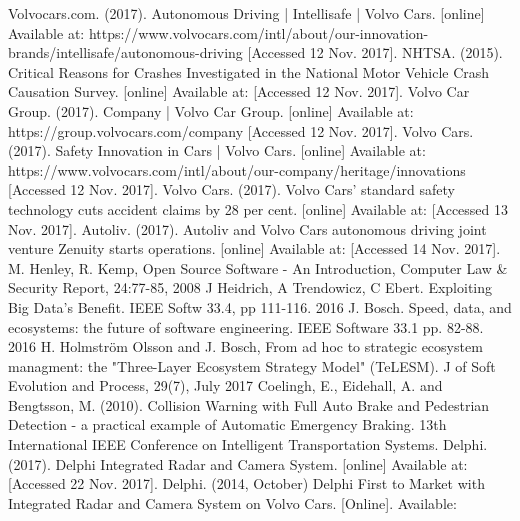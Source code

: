 \documentclass[conference]{IEEEtran}
\begin{document}
\begin{thebibliography}{00}
	 Volvocars.com. (2017). Autonomous Driving | Intellisafe | Volvo Cars. [online] Available at: https://www.volvocars.com/intl/about/our-innovation-brands/intellisafe/autonomous-driving [Accessed 12 Nov. 2017].
	 NHTSA. (2015). Critical Reasons for Crashes Investigated in the National Motor Vehicle Crash Causation Survey. [online] Available at:  [Accessed 12 Nov. 2017].
	 Volvo Car Group. (2017). Company | Volvo Car Group. [online] Available at: https://group.volvocars.com/company [Accessed 12 Nov. 2017].
	 Volvo Cars. (2017). Safety Innovation in Cars | Volvo Cars. [online] Available at: https://www.volvocars.com/intl/about/our-company/heritage/innovations [Accessed 12 Nov. 2017].
	 Volvo Cars. (2017). Volvo Cars' standard safety technology cuts accident claims by 28 per cent. [online] Available at:  [Accessed 13 Nov. 2017].
	 Autoliv. (2017). Autoliv and Volvo Cars autonomous driving joint venture Zenuity starts operations. [online] Available at:  [Accessed 14 Nov. 2017].
	 M. Henley, R. Kemp, Open Source Software - An Introduction, Computer Law \& Security Report, 24:77-85, 2008
	 J Heidrich, A Trendowicz, C Ebert. Exploiting Big Data's Benefit. IEEE Softw 33.4, pp 111-116. 2016
	 J. Bosch. Speed, data, and ecosystems: the future of software engineering. IEEE Software 33.1 pp. 82-88. 2016
	 H. Holmstr\"{o}m Olsson and J. Bosch, From ad hoc to strategic ecosystem managment: the "Three-Layer Ecosystem Strategy Model" (TeLESM). J of Soft Evolution and Process, 29(7), July 2017
	 Coelingh, E., Eidehall, A. and Bengtsson, M. (2010). Collision Warning with Full Auto Brake and Pedestrian Detection - a practical example of Automatic Emergency Braking. 13th International IEEE Conference on Intelligent Transportation Systems.
	 Delphi. (2017). Delphi Integrated Radar and Camera System. [online] Available at:  [Accessed 22 Nov. 2017].
	 Delphi. (2014, October) Delphi First to Market with Integrated Radar and Camera System on Volvo Cars. [Online]. Available: 
	

\end{thebibliography}
\end{document}
